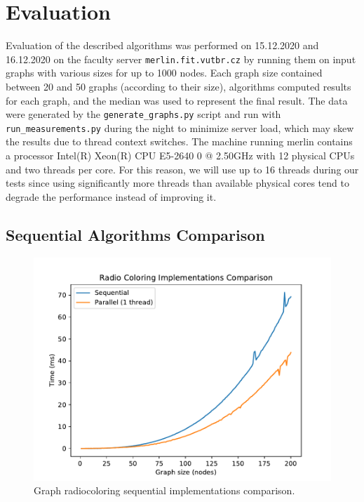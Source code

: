 \documentclass[11pt,a4paper]{article}
\begin{document}
\section{Evaluation}
\label{sec:eval}

Evaluation of the described algorithms was performed on 15.12.2020 and 16.12.2020 on the faculty server \texttt{merlin.fit.vutbr.cz} by running them on input graphs with various sizes for up to 1000 nodes. Each graph size contained between 20 and 50 graphs (according to their size), algorithms computed results for each graph, and the median was used to represent the final result. The data were generated by the \texttt{generate\_graphs.py} script and run with \texttt{run\_measurements.py} during the night to minimize server load, which may skew the results due to thread context switches. The machine running merlin contains a processor Intel(R) Xeon(R) CPU E5-2640 0 @ 2.50GHz with 12 physical CPUs and two threads per core. For this reason, we will use up to 16 threads during our tests since using significantly more threads than available physical cores tend to degrade the performance instead of improving it.

\subsection{Sequential Algorithms Comparison}
\label{ssec:seq_comps}

\begin{figure}[t]
   \centering
   \includegraphics[width=0.6\linewidth]{seq_impl_comparison.pdf}
   \caption{Graph radiocoloring sequential implementations comparison.}
   \label{fig:seq_impl_comparison}
\end{figure}
\end{document}
